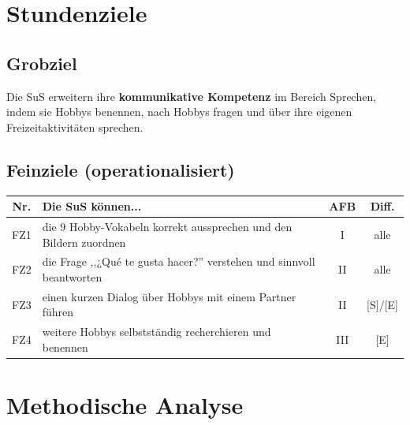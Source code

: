 \documentclass[11pt,a4paper]{article}
\begin{document}
\section{Stundenziele}

\subsection{Grobziel}
Die SuS erweitern ihre \textbf{kommunikative Kompetenz} im Bereich Sprechen, indem sie Hobbys benennen, nach Hobbys fragen und über ihre eigenen Freizeitaktivitäten sprechen.

\subsection{Feinziele (operationalisiert)}
\begin{tabular}{|c|p{8cm}|c|c|}
\hline
\textbf{Nr.} & \textbf{Die SuS können...} & \textbf{AFB} & \textbf{Diff.} \\
\hline
FZ1 & die 9 Hobby-Vokabeln korrekt aussprechen und den Bildern zuordnen & I & alle \\
\hline
FZ2 & die Frage ,,¿Qué te gusta hacer?'' verstehen und sinnvoll beantworten & II & alle \\
\hline
FZ3 & einen kurzen Dialog über Hobbys mit einem Partner führen & II & [S]/[E] \\
\hline
FZ4 & weitere Hobbys selbstständig recherchieren und benennen & III & [E] \\
\hline
\end{tabular}

\section{Methodische Analyse}
\end{document}
